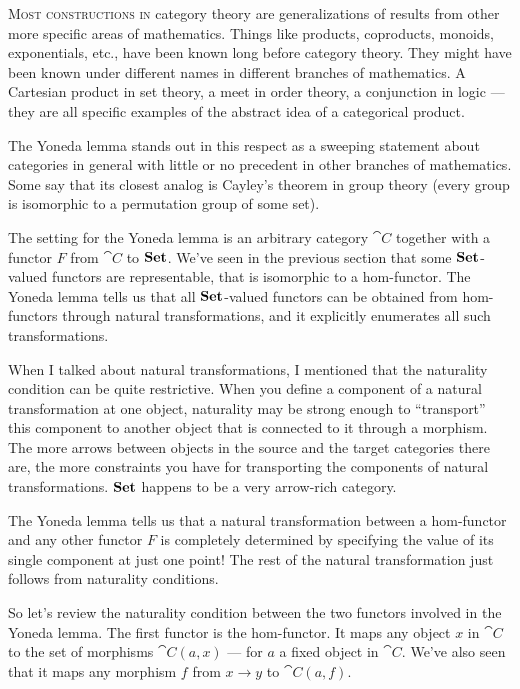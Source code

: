 
\lettrine[lhang=0.17]{M}{ost constructions in} category theory are generalizations of results
from other more specific areas of mathematics. Things like products,
coproducts, monoids, exponentials, etc., have been known long before
category theory. They might have been known under different names in
different branches of mathematics. A Cartesian product in set theory, a
meet in order theory, a conjunction in logic --- they are all specific
examples of the abstract idea of a categorical product.

The Yoneda lemma stands out in this respect as a sweeping statement
about categories in general with little or no precedent in other
branches of mathematics. Some say that its closest analog is Cayley's
theorem in group theory (every group is isomorphic to a permutation
group of some set).

The setting for the Yoneda lemma is an arbitrary category $\cat{C}$
together with a functor $F$ from $\cat{C}$ to $\mathbf{Set}$. We've
seen in the previous section that some $\mathbf{Set}$-valued functors are
representable, that is isomorphic to a hom-functor. The Yoneda lemma
tells us that all $\mathbf{Set}$-valued functors can be obtained from
hom-functors through natural transformations, and it explicitly
enumerates all such transformations.

When I talked about natural transformations, I mentioned that the
naturality condition can be quite restrictive. When you define a
component of a natural transformation at one object, naturality may be
strong enough to ``transport'' this component to another object that is
connected to it through a morphism. The more arrows between objects in
the source and the target categories there are, the more constraints you
have for transporting the components of natural transformations.
$\mathbf{Set}$ happens to be a very arrow-rich category.

The Yoneda lemma tells us that a natural transformation between a
hom-functor and any other functor $F$ is completely determined by
specifying the value of its single component at just one point! The rest
of the natural transformation just follows from naturality conditions.

So let's review the naturality condition between the two functors
involved in the Yoneda lemma. The first functor is the hom-functor. It
maps any object $x$ in $\cat{C}$ to the set of morphisms
$\cat{C}(a, x)$ --- for $a$ a fixed object in $\cat{C}$. We've
also seen that it maps any morphism $f$ from $x \to y$ to $\cat{C}(a, f)$.


